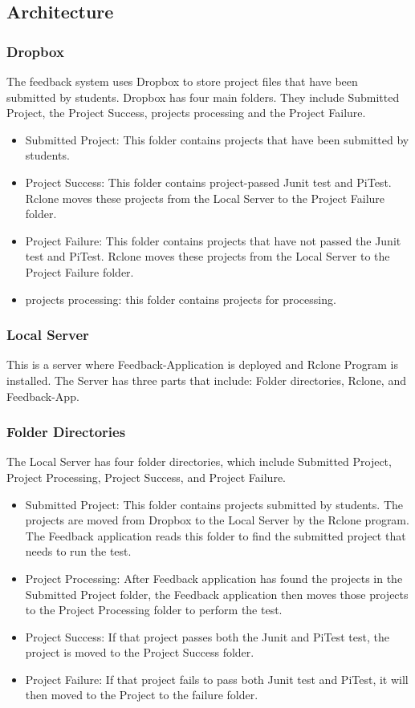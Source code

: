 \newpage
\subsection{Architecture}
\subsubsection{Dropbox}
The feedback system uses Dropbox to store project files that have been submitted by students. Dropbox has four main folders. They include Submitted Project, the Project Success, projects processing and the Project Failure.
\begin{itemize}
\item Submitted Project: This folder contains projects that have been submitted by students.
\item Project Success: This folder contains project-passed Junit test and PiTest. Rclone moves these projects from the Local Server to the Project Failure folder.
\item Project Failure: This folder contains projects that have not passed the Junit test and PiTest. Rclone moves these projects from the Local Server to the Project Failure folder.
\item projects processing: this folder contains projects for processing.  
\end{itemize}
\subsubsection{Local Server}
This is a server where Feedback-Application is deployed and Rclone Program is installed. The Server has three parts that include: Folder directories, Rclone, and Feedback-App.
\subsubsection{Folder Directories}
The Local Server has four folder directories, which include Submitted Project, Project Processing, Project Success, and Project Failure.
\begin{itemize}
\item Submitted Project: This folder contains projects submitted by students. The projects are moved from Dropbox to the Local Server by the Rclone program. The Feedback application reads this folder to find the submitted project that needs to run the test.
\item Project Processing: After Feedback application has found the projects in the Submitted Project folder, the Feedback application then moves those projects to the Project Processing folder to perform the test. 
\item Project Success: If that project passes both the Junit and PiTest test, the project is moved to the Project Success folder.
\item Project Failure: If that project fails to pass both Junit test and PiTest, it will then moved to the Project to the failure folder.
\end{itemize}
